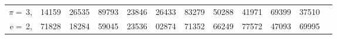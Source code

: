 \documentclass[12pt]{extarticle}
\begin{document}
\pagestyle{empty}
\color{white}
\parindent=0cm
\noindent
\hskip-2.25mm%
\setlength{\tabcolsep}{1pt}
\renewcommand*{\arraystretch}{1.0}
\begin{tabularx}{\textwidth}{r@{\hskip -0.6pt}lllllllllll}
$\pi=\,$3,&14159&26535&89793&23846&26433&83279&50288&41971&69399&37510\\
$\mathrm{e}=\,$2,&71828&18284&59045&23536&02874&71352&66249&77572&47093&69995\\
\end{tabularx}
\end{document}
